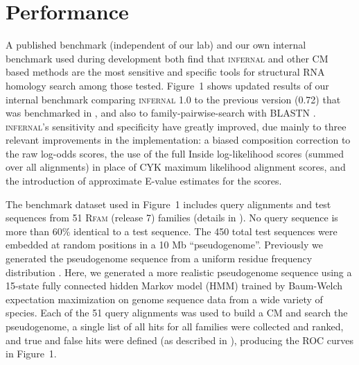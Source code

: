 \section{Performance}

A published benchmark (independent of our lab) \citep{Freyhult07} and
our own internal benchmark used during development
\citep{NawrockiEddy07} both find that \textsc{infernal} and other CM
based methods are the most sensitive and specific tools for structural
RNA homology search among those tested. Figure~1 shows
updated results of our internal benchmark comparing \textsc{infernal}
1.0 to the previous version (0.72) that was benchmarked in
\citet{Freyhult07}, and also to family-pairwise-search with BLASTN
\citep{Altschul97,Grundy98b}.  \textsc{infernal}'s sensitivity and
specificity have greatly improved, due mainly to 
three relevant improvements in the implementation: a biased
composition correction to the raw log-odds scores, the use of the full
Inside log-likelihood scores (summed over all alignments) in place of
CYK maximum likelihood alignment scores, and the introduction of
approximate E-value estimates for the scores.

The benchmark dataset used in Figure~1 includes query alignments and
test sequences from 51 \textsc{Rfam} (release 7) families (details in
\citep{NawrockiEddy07}).  No query sequence is more than 60\% identical
to a test sequence.  The 450 total test sequences were embedded at
random positions in a 10 Mb ``pseudogenome''.  Previously we generated
the pseudogenome sequence from a uniform residue frequency
distribution \citep{NawrockiEddy07}.  Here, we generated a more
realistic pseudogenome sequence using a 15-state fully connected
hidden Markov model (HMM) trained by Baum-Welch expectation
maximization \citep{Durbin98} on genome sequence data from a wide
variety of species.  Each of the 51 query alignments was used to build
a CM and search the pseudogenome, a single list of all hits for all
families were collected and ranked, and true and false hits were
defined (as described in \citet{NawrockiEddy07}), producing the ROC
curves in Figure~1.

